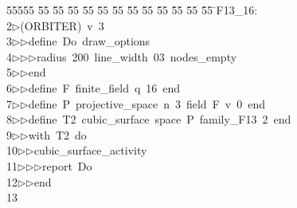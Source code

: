%
%
\begin{tabbing}
55555 \= 55 \= 55 \= 55 \= 55 \= 55 \= 55 \= 55 \= 55 \= 55 \= 55 \= 55 \= 55 \= \>F13\_16:\\[0pt]
2\>$\triangleright$\>(ORBITER)\ v\ 3\ \\[0pt]
3\>$\triangleright$\>$\triangleright$\>define\ Do\ draw\_options\ \\[0pt]
4\>$\triangleright$\>$\triangleright$\>$\triangleright$\>radius\ 200\ line\_width\ 03\ nodes\_empty\ \\[0pt]
5\>$\triangleright$\>$\triangleright$\>end\ \\[0pt]
6\>$\triangleright$\>$\triangleright$\>define\ F\ finite\_field\ q\ 16\ end\ \\[0pt]
7\>$\triangleright$\>$\triangleright$\>define\ P\ projective\_space\ n\ 3\ field\ F\ v\ 0\ end\ \\[0pt]
8\>$\triangleright$\>$\triangleright$\>define\ T2\ cubic\_surface\ space\ P\ family\_F13\ 2\ end\ \\[0pt]
9\>$\triangleright$\>$\triangleright$\>with\ T2\ do\ \\[0pt]
10\>$\triangleright$\>$\triangleright$\>cubic\_surface\_activity\ \\[0pt]
11\>$\triangleright$\>$\triangleright$\>$\triangleright$\>report\ Do\ \\[0pt]
12\>$\triangleright$\>$\triangleright$\>end\\[0pt]
13\>\end{tabbing}
